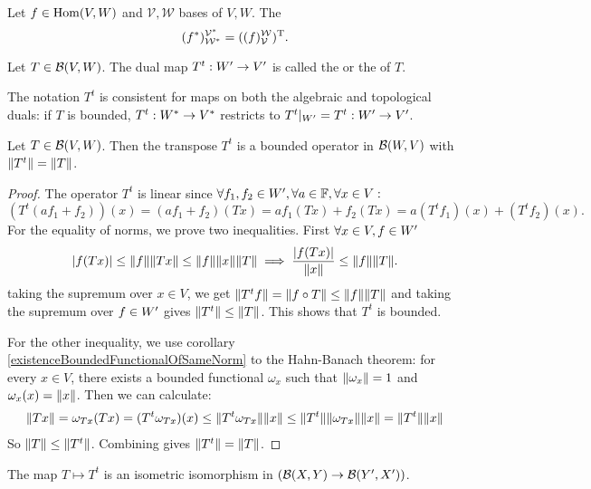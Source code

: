 \begin{proposition} \label{transpDual}
Let $f\in\operatorname{Hom}(V,W)$ and $\mathcal{V}, \mathcal{W}$ bases of $V,W$. The
\[ (f^*)^{\mathcal{V}^*}_{\mathcal{W}^*} = ((f)^{\mathcal{W}}_{\mathcal{V}})^{\mathrm{T}}. \] 
\end{proposition}

\begin{definition}
Let $T\in\operatorname{\mathcal{B}}(V,W)$. The dual map $T^t: {W}^\prime\to {V}^\prime$ is called the  or the  of $T$.
\end{definition}
The notation $T^t$ is consistent for maps on both the algebraic and topological duals: if $T$ is bounded, $T^t:{W}^*\to {V}^*$ restricts to $T^t|_{{W}^\prime} = T^t:{W}^\prime\to {V}^\prime$.

\begin{proposition}
Let $T\in\operatorname{\mathcal{B}}(V,W)$. Then the transpose $T^t$ is a bounded operator in $\operatorname{\mathcal{B}}(W,V)$ with $\lVert T^t\rVert = \lVert T\rVert$.
\end{proposition}
\begin{proof}
The operator $T^t$ is linear since $\forall f_1,f_2\in {W}^\prime, \forall a\in\mathbb{F}, \forall x\in V:$
\[ (T^t(af_1 + f_2))(x) = (af_1 + f_2)(Tx) = af_1(Tx) + f_2(Tx) = a(T^tf_1)(x) + (T^tf_2)(x). \]
For the equality of norms, we prove two inequalities. First $\forall x\in V, f\in {W}^\prime$
\[ |f(Tx)|\leq \lVert f\rVert\lVert Tx\rVert\leq \lVert f\rVert\lVert x\rVert\lVert T\rVert \implies \frac{|f(Tx)|}{\lVert x\rVert} \leq \lVert f\rVert\lVert T\rVert. \]
taking the supremum over $x\in V$, we get $\lVert T^tf\rVert = \lVert f\circ T\rVert\leq \lVert f\rVert\lVert T\rVert$ and taking the supremum over $f\in {W}^\prime$ gives $\lVert T^t\rVert\leq \lVert T\rVert$. This shows that $T^t$ is bounded.

For the other inequality, we use corollary \ref{existenceBoundedFunctionalOfSameNorm} to the Hahn-Banach theorem: for every $x\in V$, there exists a bounded functional $\omega_x$ such that $\lVert\omega_x\rVert=1$ and $\omega_x(x) = \lVert x\rVert$. Then we can calculate:
\begin{align*}
\lVert Tx\rVert = \omega_{Tx}(Tx) = (T^t\omega_{Tx})(x) \leq \lVert T^t\omega_{Tx}\rVert\lVert x\rVert \leq \lVert T^t\rVert\lVert\omega_{Tx}\rVert\lVert x\rVert = \lVert T^t\rVert\lVert x\rVert
\end{align*}
So $\lVert T\rVert\leq\lVert T^t\rVert$. Combining gives $\lVert T^t\rVert=\lVert T\rVert$.
\end{proof}
\begin{corollary}
The map $T\mapsto T^t$ is an isometric isomorphism in $(\operatorname{\mathcal{B}}(X,Y)\to \operatorname{\mathcal{B}}({Y}^\prime, {X}^\prime))$.
\end{corollary}

